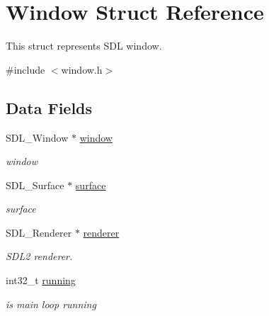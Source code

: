 \hypertarget{structWindow}{}\section{Window Struct Reference}
\label{structWindow}


This struct represents S\+DL window.  




{\ttfamily \#include $<$window.\+h$>$}

\subsection*{Data Fields}
\begin{DoxyCompactItemize}
\item 
\mbox{\label{structWindow_ae39a7755a5a6ab74bcbdbe3e2e206820}} 
S\+D\+L\+\_\+\+Window $\ast$ \hyperlink{structWindow_ae39a7755a5a6ab74bcbdbe3e2e206820}{window}
\begin{DoxyCompactList}\small\item\em window \end{DoxyCompactList}\item 
\mbox{\label{structWindow_a1a42da4979d383bb3556f62df57952e5}} 
S\+D\+L\+\_\+\+Surface $\ast$ \hyperlink{structWindow_a1a42da4979d383bb3556f62df57952e5}{surface}
\begin{DoxyCompactList}\small\item\em surface \end{DoxyCompactList}\item 
\mbox{\label{structWindow_a2b52309ef359b6392454a3bb57398b5d}} 
S\+D\+L\+\_\+\+Renderer $\ast$ \hyperlink{structWindow_a2b52309ef359b6392454a3bb57398b5d}{renderer}
\begin{DoxyCompactList}\small\item\em S\+D\+L2 renderer. \end{DoxyCompactList}\item 
\mbox{\label{structWindow_a7e076f6f94c096513fa91d0588222993}} 
int32\+\_\+t \hyperlink{structWindow_a7e076f6f94c096513fa91d0588222993}{running}
\begin{DoxyCompactList}\small\item\em is main loop running \end{DoxyCompactList}\item 

\end{DoxyCompactItemize}
